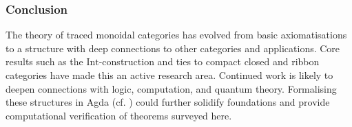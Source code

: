 \subsubsection*{Conclusion}
The theory of traced monoidal categories has evolved from basic axiomatisations
to a structure with deep connections to other categories and applications. Core
results such as the $\mathrm{Int}$-construction and ties to compact closed and
ribbon categories have made this an active research area. Continued work is
likely to deepen connections with logic, computation, and quantum theory.
Formalising these structures in Agda (cf.
\cite{hu2021-formalizing-category-theory}) could further solidify foundations
and provide computational verification of theorems surveyed here.
